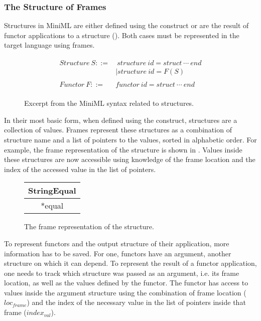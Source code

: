 \documentclass[10pt,a4paper,master=cws, masteroption=ai,english,inputenc=utf8]{kulemt}
\begin{document}
\subsubsection{The Structure of Frames \label{sec:StructureOfFrames}}
Structures in MiniML are either defined using the  construct or are the result of functor applications to a structure ().
Both cases must be represented in the target language using frames.

\begin{figure}[htb]
\begin{align*}
\begin{aligned}
\mathit{Structure\ }S ::= &\ \mathit{structure\ } \mathit{id} = \mathit{struct\ }\cdots \mathit{\ end}\\
& |\mathit{structure\ } \mathit{id} = F(S)\\
\\
\mathit{Functor\ }F ::=&\mathit{functor\ } \mathit{id} = \mathit{struct\ }\cdots\mathit{\ end}
\end{aligned}
\end{align*}
\caption{Excerpt from the MiniML syntax related to structures\label{fig:FunctorGrammarExcerpt}.}
\end{figure}

In their most basic form, when defined using the  construct, structures are a collection of values.
Frames represent these structures as a combination of structure name and a list of pointers to the values, sorted in alphabetic order.
For example, the frame representation of the  structure is shown in .
Values inside these structures are now accessible using knowledge of the frame location and the index of the accessed value in the list of pointers.

\begin{figure}[H]
\centering
\begin{tabular}{|c|}
\hline
StringEqual \\
\hline
*equal \\
\hline
\end{tabular}
\caption{The frame representation of the  structure.\label{fig:StringEqualFrame}}
\end{figure}

To represent functors and the output structure of their application, more information has to be saved. 
For one, functors have an argument, another structure on which it can depend.
To represent the result of a functor application, one needs to track which structure was passed as an argument, i.e. its frame location, as well as the values defined by the functor.
The functor has access to values inside the argument structure using the combination of frame location ($loc_{frame}$) and the index of the necessary value in the list of pointers inside that frame ($index_{val}$).
\end{document}
